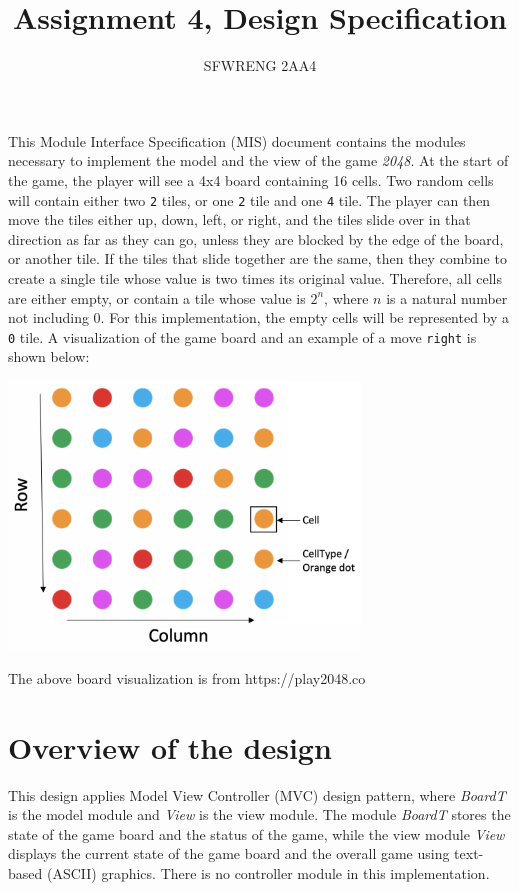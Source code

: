 \documentclass[12pt]{article}
\title{Assignment 4, Design Specification}
\author{SFWRENG 2AA4}
\begin{document}
\maketitle
This Module Interface Specification (MIS) document contains the modules necessary to implement the model and the view of the game \textit{2048}. At the start of the game, the player will see a 4x4 board containing 16 cells. Two random cells will contain either two \texttt{2} tiles, or one \texttt{2} tile and one \texttt{4} tile. The player can then move the tiles either up, down, left, or right, and the tiles slide over in that direction as far as they can go, unless they are blocked by the edge of the board, or another tile. If the tiles that slide together are the same, then they combine to create a single tile whose value is two times its original value. Therefore, all cells are either empty, or contain a tile whose value is $2^n$, where $n$ is a natural number not including $0$. For this implementation, the empty cells will be represented by a \texttt{0} tile. A visualization of the game board and an example of a move \texttt{right} is shown below:

\begin{center}
  \includegraphics[width=0.7\textwidth]{naming.png}

  The above board visualization is from https://play2048.co
\end{center}

\newpage

\section{Overview of the design}

This design applies Model View Controller (MVC) design pattern, where \textit{BoardT} is the model module and \textit{View} is the view module. The module \textit{BoardT} stores the state of the game board and the status of the game, while the view module \textit{View} displays the current state of the game board and the overall game using text-based (ASCII) graphics. There is no controller module in this implementation.
\end{document}
